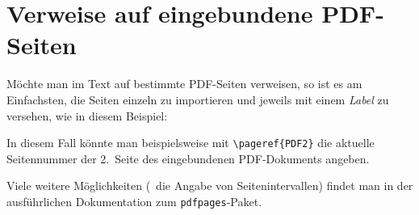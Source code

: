\section{Verweise auf eingebundene PDF-Seiten}

Möchte man im Text auf bestimmte PDF-Seiten verweisen,
so ist es am Einfachsten, die Seiten einzeln zu importieren und jeweils
mit einem \emph{Label} zu versehen, wie in diesem Beispiel:
%
\begin{LaTeXCode}[numbers=none]


\end{LaTeXCode}
%
In diesem Fall könnte man beispielsweise mit \verb!\pageref{PDF2}!
die aktuelle Seitennummer der 2.\ Seite des eingebundenen PDF-Dokuments 
angeben.

Viele weitere Möglichkeiten (\zB\ die Angabe von Seitenintervallen) findet man
in der ausführlichen Dokumentation zum \texttt{pdfpages}-Paket.







